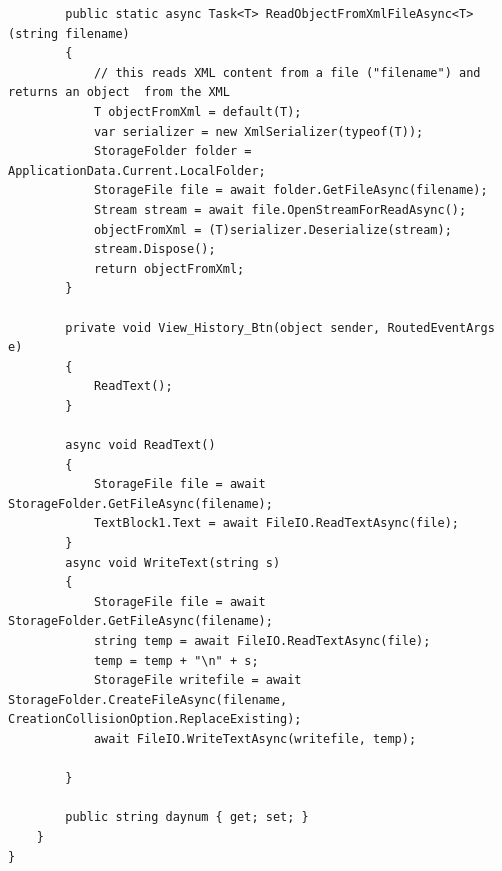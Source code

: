 \documentclass[runningheads,a4paper]{llncs}
\begin{document}
\begin{lstlisting}
        public static async Task<T> ReadObjectFromXmlFileAsync<T>(string filename)
        {
            // this reads XML content from a file ("filename") and returns an object  from the XML
            T objectFromXml = default(T);
            var serializer = new XmlSerializer(typeof(T));
            StorageFolder folder = ApplicationData.Current.LocalFolder;
            StorageFile file = await folder.GetFileAsync(filename);
            Stream stream = await file.OpenStreamForReadAsync();
            objectFromXml = (T)serializer.Deserialize(stream);
            stream.Dispose();
            return objectFromXml;
        }

        private void View_History_Btn(object sender, RoutedEventArgs e)
        {
            ReadText();
        }

        async void ReadText()
        {
            StorageFile file = await StorageFolder.GetFileAsync(filename);
            TextBlock1.Text = await FileIO.ReadTextAsync(file);
        }
        async void WriteText(string s)
        {
            StorageFile file = await StorageFolder.GetFileAsync(filename);
            string temp = await FileIO.ReadTextAsync(file);
            temp = temp + "\n" + s;
            StorageFile writefile = await StorageFolder.CreateFileAsync(filename, CreationCollisionOption.ReplaceExisting);
            await FileIO.WriteTextAsync(writefile, temp);
          
        }

        public string daynum { get; set; }
    }
}

\end{lstlisting}
\end{document}
